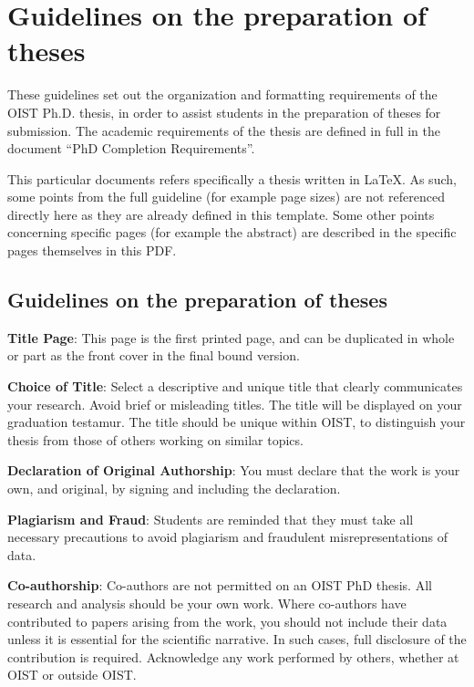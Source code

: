 
\chapter{Guidelines on the preparation of theses} \label{ch-1}

These guidelines set out the organization and formatting requirements of the OIST Ph.D. thesis, in order to assist students in the preparation of theses for submission. The academic requirements of the thesis are defined in full in the document ``PhD Completion Requirements''. 

This particular documents refers specifically a thesis written in \LaTeX. As such, some points from the full guideline (for example page sizes) are not referenced directly here as they are already defined in this template. Some other points concerning specific pages (for example the abstract) are described in the specific pages themselves in this PDF.

\section{Guidelines on the preparation of theses}

\textbf{Title Page}:  This page is the first printed page, and can be duplicated in whole or part as the front cover in the final bound version.

\textbf{Choice of Title}: Select a descriptive and unique title that clearly communicates your research.  Avoid brief or misleading titles.  The title will be displayed on your graduation testamur.  The title should be unique within OIST, to distinguish your thesis from those of others working on similar topics.

\textbf{Declaration of Original Authorship}:  You must declare that the work is your own, and original,  by signing and including the declaration.  

\textbf{Plagiarism and Fraud}:  Students are reminded that they must take all necessary precautions to avoid plagiarism and fraudulent misrepresentations of data. 

\textbf{Co-authorship}:  Co-authors are not permitted on an OIST PhD thesis. All research and analysis should be your own work. Where co-authors have contributed to papers arising from the work, you should not include their data unless it is essential for the scientific narrative.  In such cases, full disclosure of the contribution is required. Acknowledge any work performed by others, whether at OIST or outside OIST.

